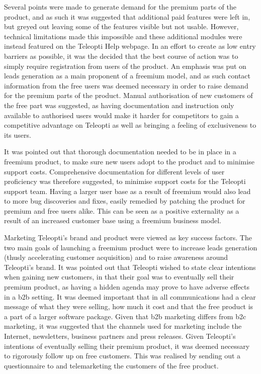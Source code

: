 Several points were made to generate demand for the premium parts of the product, and as such it was suggested that additional paid features were left in, but greyed out leaving some of the features visible but not usable. However, technical limitations made this impossible and these additional modules were instead featured on the Teleopti Help webpage. In an effort to create as low entry barriers as possible, it was the decided that the best course of action was to simply require registration from users of the product. An emphasis was put on leads generation as a main proponent of a freemium model, and as such contact information from the free users was deemed necessary in order to raise demand for the premium parts of the product. Manual authorisation of new customers of the free part was suggested, as having documentation and instruction only available to authorised users would make it harder for competitors to gain a competitive advantage on Teleopti as well as bringing a feeling of exclusiveness to its users.


It was pointed out that thorough documentation needed to be in place in a freemium product, to make sure new users adopt to the product and to minimise support costs. Comprehensive documentation for different levels of user proficiency was therefore suggested, to minimise support costs for the Teleopti support team. Having a larger user base as a result of freemium would also lead to more bug discoveries and fixes, easily remedied by patching the product for premium and free users alike. This can be seen as a positive externality as a result of an increased customer base using a freemium business model. 


Marketing Teleopti's brand and product were viewed as key success factors. The two main goals of launching a freemium product were to increase leads generation (thusly accelerating customer acquisition) and to raise awareness around Teleopti's brand. It was pointed out that Teleopti wished to state clear intentions when gaining new customers, in that their goal was to eventually sell their premium product, as having a hidden agenda may prove to have adverse effects in a \gls{b2b} setting. It was deemed important that in all communications had a clear message of what they were selling, how much it cost and that the free product is a part of a larger software package. Given that \gls{b2b} marketing differs from \gls{b2c} marketing, it was suggested that the channels used for marketing include the Internet, newsletters, business partners and press releases. Given Teleopti's intentions of eventually selling their premium product, it was deemed necessary to rigorously follow up on free customers. This was realised by sending out a questionnaire to and telemarketing the customers of the free product. 



